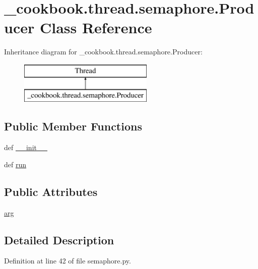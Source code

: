 \hypertarget{class__cookbook_1_1thread_1_1semaphore_1_1Producer}{\section{\-\_\-cookbook.\-thread.\-semaphore.\-Producer Class Reference}
\label{class__cookbook_1_1thread_1_1semaphore_1_1Producer}
}
Inheritance diagram for \-\_\-cookbook.\-thread.\-semaphore.\-Producer\-:\begin{figure}[H]
\begin{center}
\leavevmode
\includegraphics[height=2.000000cm]{dc/ddd/class__cookbook_1_1thread_1_1semaphore_1_1Producer}
\end{center}
\end{figure}
\subsection*{Public Member Functions}
\begin{DoxyCompactItemize}
\item 
def \hyperlink{class__cookbook_1_1thread_1_1semaphore_1_1Producer_a90c647987606af89572fb06cc99264a4}{\-\_\-\-\_\-init\-\_\-\-\_\-}
\item 
def \hyperlink{class__cookbook_1_1thread_1_1semaphore_1_1Producer_a28b97d68456cbad8eb0938dd36cae1db}{run}
\end{DoxyCompactItemize}
\subsection*{Public Attributes}
\begin{DoxyCompactItemize}
\item 
\hyperlink{class__cookbook_1_1thread_1_1semaphore_1_1Producer_ad9bb19976d4019473b25933e8589fb95}{arg}
\end{DoxyCompactItemize}


\subsection{Detailed Description}


Definition at line 42 of file semaphore.\-py.



